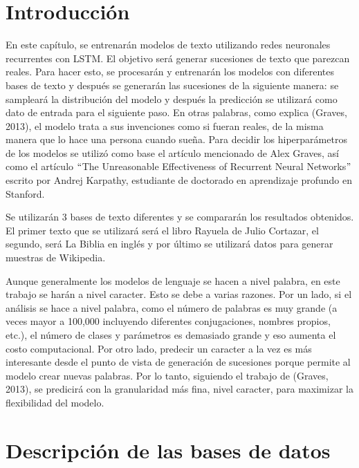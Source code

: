 \section{Introducción}
En este capítulo, se entrenarán modelos de texto utilizando redes neuronales recurrentes con LSTM. El objetivo será generar sucesiones de texto que parezcan reales. Para hacer esto, se procesarán y entrenarán los modelos con diferentes bases de texto y después se generarán las sucesiones de la siguiente manera: se sampleará la distribución del modelo y después la predicción se utilizará como dato de entrada para el siguiente paso. En otras palabras, como explica (Graves, 2013), el modelo trata a sus invenciones como si fueran reales, de la misma manera que lo hace una persona cuando sueña. Para decidir los hiperparámetros de los modelos se utilizó como base el artículo mencionado de Alex Graves, así como el artículo $``$The Unreasonable Effectiveness of Recurrent Neural Networks$"$ escrito por Andrej Karpathy, estudiante de doctorado en aprendizaje profundo en Stanford.
\cite{DBLP:journals/corr/Graves13}
\cite{unreasonable}

\vspace{1em}

Se utilizarán 3 bases de texto diferentes y se compararán los resultados obtenidos. El primer texto que se utilizará será el libro Rayuela de Julio Cortazar, el segundo, será La Biblia en inglés y por último se utilizará datos para generar muestras de Wikipedia.

\vspace{1em}

Aunque generalmente los modelos de lenguaje se hacen a nivel palabra, en este trabajo se harán a nivel caracter. Esto se debe a varias razones. Por un lado, si el análisis se hace a nivel palabra, como el número de palabras es muy grande (a veces mayor a 100,000 incluyendo diferentes conjugaciones, nombres propios, etc.), el número de clases y parámetros es demasiado grande y eso aumenta el costo computacional. Por otro lado, predecir un caracter a la vez es más interesante desde el punto de vista de generación de sucesiones porque permite al modelo crear nuevas palabras. Por lo tanto, siguiendo el trabajo de (Graves, 2013), se predicirá con la granularidad más fina, nivel caracter, para maximizar la flexibilidad del modelo.
\cite{DBLP:journals/corr/Graves13}

\section{Descripción de las bases de datos}

